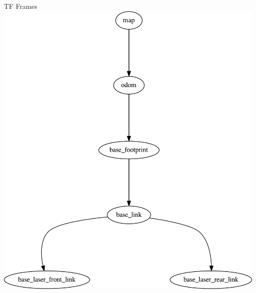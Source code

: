 \begin{frame}{TF Frames}
\centering
\includegraphics[height=0.9\textheight]{slides/gfx/frames_cleaned}

 
\end{frame}